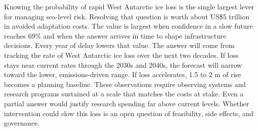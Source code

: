 \documentclass[11pt]{article}
\begin{document}
Knowing the probability of rapid West Antarctic ice loss is the single largest lever for managing sea-level risk. Resolving that question is worth about US\$5 trillion in avoided adaptation costs. The value is largest when confidence in a slow future reaches 69\% and when the answer arrives in time to shape infrastructure decisions. Every year of delay lowers that value. The answer will come from tracking the rate of West Antarctic ice loss over the next two decades. If loss stays near current rates through the 2030s and 2040s, the forecast will narrow toward the lower, emissions-driven range. If loss accelerates, 1.5 to 2 m of rise becomes a planning baseline. These observations require observing systems and research programs sustained at a scale that matches the costs at stake. Even a partial answer would justify research spending far above current levels. Whether intervention could slow this loss is an open question of feasibility, side effects, and governance.
\end{document}
